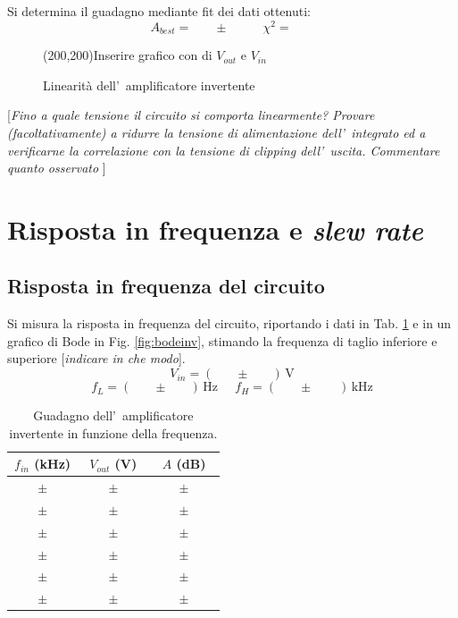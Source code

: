 \documentclass[10pt,a4paper]{article}
\newcommand{\rem}[1]{[\emph{#1}]}
\newcommand{\exn}{\phantom{xxx}}
\begin{document}
	Si determina il guadagno mediante fit dei dati ottenuti:
	\[
	A_{best} = \exn \pm \exn \quad  \chi^2 = \exn
	\]
	\begin{figure}[t]
		\begin{center}
			\framebox(200,200){Inserire grafico con di $V_{out}$ e $V_{in}$}
		\end{center}
		\caption{\small Linearit\`a dell'~amplificatore invertente}
		\label{fig:lin}
	\end{figure}
	
	\rem{Fino a quale tensione il circuito si comporta linearmente? Provare (facoltativamente) a ridurre la 
		tensione di alimentazione dell'~integrato ed a verificarne la correlazione con la tensione di 
		\emph{clipping} dell'~uscita. Commentare quanto osservato }
	
	\section{Risposta in frequenza e \emph{slew rate}}
	\subsection{Risposta in frequenza del circuito}
	Si misura la risposta in frequenza del circuito, riportando i dati  in Tab. \ref{tab:bodeinv} e
	in un grafico di Bode in Fig. \ref{fig:bodeinv}, stimando la frequenza di taglio inferiore e 
	superiore \rem{indicare in che modo}.
	\[
	V_{in} = (\exn \pm \exn )\,\mathrm{V}
	\]
	\[
	f_L = (\exn \pm \exn )\,\mathrm{Hz}\;\;\;\;\;f_H = (\exn \pm \exn \;)\,\mathrm{kHz}
	\]
	\begin{table}[h]
		\caption{\small Guadagno dell'~amplificatore invertente in funzione della frequenza.}
		\label{tab:bodeinv}
		\begin{center}
			\begin{tabular}{|c|c|c|}
				\hline
				$f_{in}$ (kHz) & $V_{out}$ (V) & $A$ (dB) \\
				\hline
				$\exn \pm \exn $ & $\exn \pm \exn $ & $\exn \pm \exn $\\
				\hline
				$\exn \pm \exn $ & $\exn \pm \exn $ & $\exn \pm \exn $\\
				\hline
				$\exn \pm \exn $ & $\exn \pm \exn $ & $\exn \pm \exn $\\
				\hline
				$\exn \pm \exn $ & $\exn \pm \exn $ & $\exn \pm \exn $\\
				\hline
				$\exn \pm \exn $ & $\exn \pm \exn $ & $\exn \pm \exn $\\
				\hline
				$\exn \pm \exn $ & $\exn \pm \exn $ & $\exn \pm \exn $\\
				\hline
			\end{tabular}
		\end{center}
	\end{table} 
	
\end{document}
